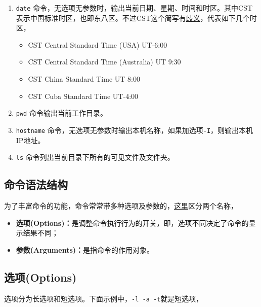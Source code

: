 \documentclass[doctor,openright,twoside]{sjtuthesis}
\providecommand{\tightlist}{%
    \setlength{\itemsep}{0pt}\setlength{\parskip}{0pt}}
\newcommand{\passthrough}[1]{#1}
\theoremstyle{plain}
\theoremstyle{definition}
\theoremstyle{remark}
\theoremstyle{ocrenumbox}
\theoremstyle{plain}
\begin{document}
\begin{enumerate}
\def\labelenumi{\arabic{enumi}.}
\tightlist
\item
  \passthrough{\lstinline!date!} 命令，无选项无参数时，输出当前日期、星期、时间和时区。其中CST表示中国标准时区，也即东八区。不过CST这个简写有\href{https://blog.csdn.net/sjpljr/article/details/70169056}{歧义}，代表如下几个时区，

  \begin{itemize}
  \tightlist
  \item
    CST Central Standard Time (USA) UT-6:00
  \item
    CST Central Standard Time (Australia) UT 9:30
  \item
    CST China Standard Time UT 8:00
  \item
    CST Cuba Standard Time UT-4:00
  \end{itemize}
\item
  \passthrough{\lstinline!pwd!} 命令输出当前工作目录。
\item
  \passthrough{\lstinline!hostname!} 命令，无选项无参数时输出本机名称，如果加选项\passthrough{\lstinline!-I!}，则输出本机IP地址。
\item
  \passthrough{\lstinline!ls!} 命令列出当前目录下所有的可见文件及文件夹。
\end{enumerate}

\hypertarget{section-41}{%
\subsection{命令语法结构}\label{section-41}}

为了丰富命令的功能，命令常常带多种选项及参数的，\href{https://www.jb51.net/os/RedHat/518485.html}{这里}区分两个名称，

\begin{itemize}
\tightlist
\item
  \textbf{选项(Options)：}是调整命令执行行为的开关，即，选项不同决定了命令的显示结果不同；
\item
  \textbf{参数(Arguments)：}是指命令的作用对象。
\end{itemize}

\hypertarget{options}{%
\subsection{选项(Options)}\label{options}}

选项分为长选项和短选项。下面示例中，\passthrough{\lstinline!-l -a -t!}就是短选项，
\end{document}
